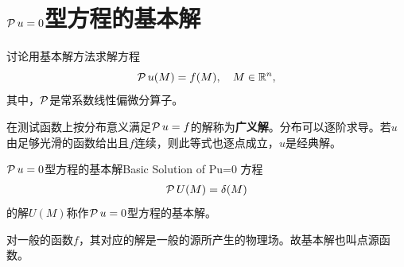 \section{\texorpdfstring{$\operatorname{\mathcal P} u = 0$}{Pu=0}型方程的基本解} %
讨论用基本解方法求解方程
\[
	\operatorname{\mathcal P} u(M) = f(M),\quad M \in \mathbb{R}^n,
\]
其中，$\operatorname{\mathcal P}$是常系数线性偏微分算子。

在测试函数上按分布意义满足$\operatorname{\mathcal P} u = f$的解称为\textbf{广义解}。分布可以逐阶求导。若$u$由足够光滑的函数给出且$f$连续，则此等式也逐点成立，$u$是经典解。
\begin{definition}{$\operatorname{\mathcal P} u = 0$型方程的基本解}{Basic Solution of Pu=0}
	方程
	\begin{align}
		\operatorname{\mathcal P} U(M) = \delta(M)
	\end{align}
	的解$U(M)$称作$\operatorname{\mathcal P} u = 0$型方程的基本解。
\end{definition}
对一般的函数$f$，其对应的解是一般的源所产生的物理场。故基本解也叫点源函数。

